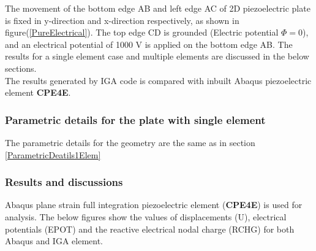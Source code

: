 \documentclass[11pt]{article}
\begin{document}
The movement of the bottom edge AB and left edge AC of 2D piezoelectric plate is fixed in y-direction and x-direction respectively, as shown in figure(\ref{PureElectrical}).
The top edge CD is grounded (Electric potential $\Phi = 0$), and an electrical potential of 1000 V  is applied on the bottom edge AB. The results for a single element case and multiple elements are discussed in the below
sections. \\
The results generated by IGA code is compared with inbuilt Abaqus piezoelectric
element \textbf{CPE4E}.

\subsubsection{Parametric details for the plate with single element}


The parametric details for the geometry are the same as in section \hyperref[ParametricDeatils1Elem]{\ref{ParametricDeatils1Elem}}

\subsubsection{Results and discussions}
Abaqus plane strain full integration piezoelectric element (\textbf{CPE4E}) is used for analysis. The below figures show the values of displacements (U), electrical potentials (EPOT) and the reactive electrical nodal charge (RCHG) for both Abaqus and IGA element.\\
\end{document}
